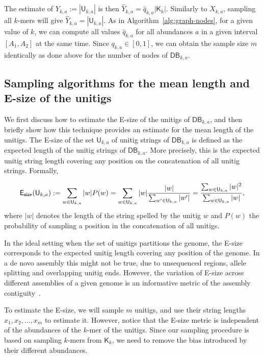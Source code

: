 \documentclass[a4paper,11pt]{article}
\newcommand{\DB}{\mathsf{DB}_{k,a}}
\newcommand{\U}{\mathsf{U}_{k,a}}
\newcommand{\K}{\mathsf{K}}
\newcommand{\esize}{{\sf E_{size}}}
\begin{document}
The estimate of $Y_{k,a} := |\U|$ is then $\hat{Y}_{k,a} = \hat{q}_{k,a}|\K_k|$. Similarly to $X_{k,a}$, sampling all $k$-mers will give $\hat{Y}_{k,a} = |\U|$. As in Algorithm~\ref{alg:graph-nodes}, for a given value of $k$, we can compute all values $\hat{q}_{k,a}$ for all abundances $a$ in a given interval $[A_1,A_2]$ at the same time. Since $q_{k,a} \in [0,1]$, we can obtain the sample size $m$ identically as done above for the number of nodes of $\DB$.

\subsection{Sampling algorithms for the mean length and E-size of the unitigs}

We first discuss how to estimate the E-size of the unitigs of $\DB$, and then briefly show how this technique provides an estimate for the mean length of the unitigs. The E-size \cite{Salzberg2011} of the set $\U$ of unitig strings of $\DB$ is defined as the expected length of the unitig strings of $\DB$. More precisely, this is the expected unitig string length covering any position on the concatenation of all unitig strings. Formally, 

\begin{equation}
\label{eq:esize}
\esize(\U) := \sum_{w \in \U}|w|P(w) = \sum_{w \in \U} |w|\frac{|w|}{\sum_{w' \in \U}|w'|} = \frac{\sum_{w \in \U}|w|^2}{\sum_{w \in \U}|w|},	
\end{equation}
where $|w|$ denotes the length of the string spelled by the unitig $w$ and $P(w)$ the probability of sampling a position in the concatenation of all unitigs. 

In the ideal setting when the set of unitigs partitions the genome, the E-size corresponds to the expected unitig length covering any position of the genome. In a de novo assembly this might not be true, due to unsequenced regions, allele splitting and overlapping unitig ends. However, the variation of E-size across different assemblies of a given genome is an informative metric of the assembly contiguity~\cite{Salzberg2011}. 

To estimate the E-size, we will sample $m$ unitigs, and use their string lengths $x_1,x_2,\dots,x_m$ to estimate it. However, notice that the E-size metric is independent of the abundances of the $k$-mer of the unitigs. Since our sampling procedure is based on sampling $k$-mers from $\K_k$, we need to remove the bias introduced by their different abundances. 
\end{document}

